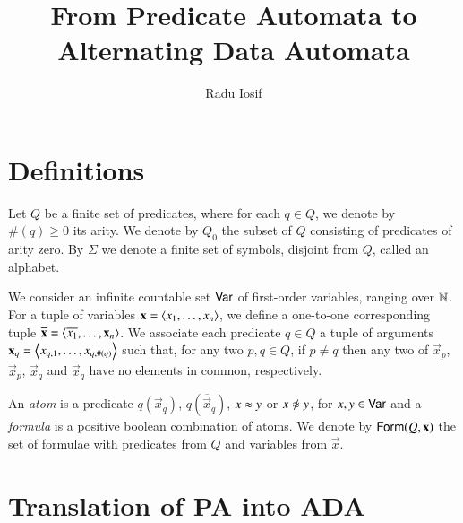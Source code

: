 \documentclass{llncs}
\begin{document}

\title{From Predicate Automata to Alternating Data Automata}

\author{Radu Iosif}

\maketitle

\section{Definitions}

Let $Q$ be a finite set of predicates, where for each $q \in Q$, we
denote by $\#(q)\geq0$ its arity. We denote by $Q_0$ the subset of $Q$
consisting of predicates of arity zero. By $\Sigma$ we denote a finite
set of symbols, disjoint from $Q$, called an alphabet.

We consider an infinite countable set $\mathsf{Var}$ of first-order
variables, ranging over ${\bf \mathbb{N}}$. For a tuple of variables $\mathbf x =
\left\langle x_1,\ldots,x_n \right\rangle$, we define a one-to-one corresponding tuple
$\overline{\mathbf x} = \left\langle \overline{x_1},\ldots,\mathbf x_n \right\rangle$. We
associate each predicate $q \in Q$ a tuple of arguments $\mathbf x_q =
\left\langle x_{q,1}, \ldots, x_{q,\#(q)} \right\rangle$ such that, for any two $p,q \in
Q$, if $p \neq q$ then any two of $\vec{x}_p$, $\overline{\vec{x}}_p$,
$\vec{x}_q$ and $\overline{\vec{x}}_q$ have no elements in common,
respectively.

An \emph{atom} is a predicate $q(\vec{x}_q)$,
$q(\overline{\vec{x}}_q)$, $x \approx y$ or $x \not\teq y$, for $x,y \in
\mathsf{Var}$ and a \emph{formula} is a positive boolean combination of
atoms. We denote by $\mathsf{Form}(Q,\mathbf x)$ the set of formulae with
predicates from $Q$ and variables from $\vec{x}$.

\begin{definition}
\end{definition}

\section{Translation of PA into ADA}

\end{document}
